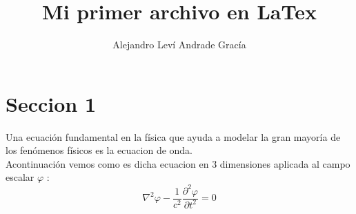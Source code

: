 \documentclass[a4paper,10pt]{article}
\title{Mi primer archivo en LaTex} %
\author{Alejandro Leví Andrade Gracía} %
\begin{document}
\maketitle

% 

\section{Seccion 1}

Una ecuación fundamental en la física que ayuda a modelar la gran mayoría de los fenómenos físicos es la ecuacion de onda. \\ %

Acontinuación vemos como es dicha ecuacion en 3 dimensiones aplicada al campo escalar $\varphi$ : \\ %

$$\nabla^2\varphi - \frac{1}{c^2} \frac{\partial^2\varphi}{\partial t^2} = 0 $$
\end{document}
